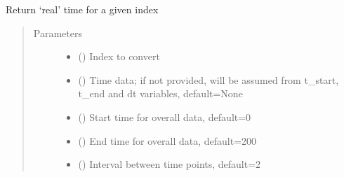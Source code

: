 \documentclass[letterpaper,10pt,english]{sphinxmanual}
\begin{document}
\begin{fulllineitems}
\label{\detokenize{_autosummary/tools.python.convert_index_to_time:tools.python.convert_index_to_time}}
\sphinxAtStartPar
Return ‘real’ time for a given index
\begin{quote}\begin{description}
\item[{Parameters}] \leavevmode\begin{itemize}
\item {} 
\sphinxAtStartPar
{} () \textendash{} Index to convert

\item {} 
\sphinxAtStartPar
{} (\sphinxstyleliteralemphasis{\sphinxupquote{, }}) \textendash{} Time data; if not provided, will be assumed from t\_start, t\_end and dt variables, default=None

\item {} 
\sphinxAtStartPar
{} (\sphinxstyleliteralemphasis{\sphinxupquote{, }}) \textendash{} Start time for overall data, default=0

\item {} 
\sphinxAtStartPar
{} (\sphinxstyleliteralemphasis{\sphinxupquote{, }}) \textendash{} End time for overall data, default=200

\item {} 
\sphinxAtStartPar
{} (\sphinxstyleliteralemphasis{\sphinxupquote{, }}) \textendash{} Interval between time points, default=2


\end{itemize}
\end{description}
\end{quote}
\end{fulllineitems}
\end{document}
